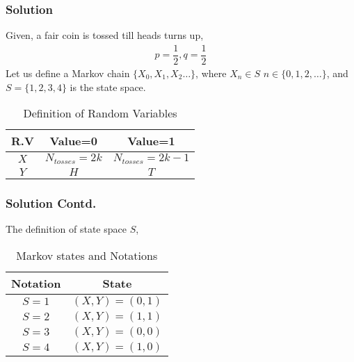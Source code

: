 \documentclass{beamer}
\begin{document}
\begin{frame}
\frametitle{Solution}
    Given, a fair coin is tossed till heads turns up,
\begin{align}
p=\dfrac{1}{2},q=\dfrac{1}{2}
\label{eq6}
\end{align}
    Let us define a Markov chain $\{X_{0},X_{1},X_{2}\dots\}$, where $X_{n}\in S$ \vee $n\in\{0,1,2,\dots\}$, and $S=\{1,2,3,4\}$ is the state space.
   \begin{table}[h!]
\centering
\caption{Definition of Random Variables}
\label{table:1}
\begin{tabular}{|c|c|c|}
    \hline
    R.V & Value=0 & Value=1 \\
    \hline
    $X$ & $N_{tosses}=2k$ & $N_{tosses}=2k-1$ \\[1ex]
    \hline
    $Y$ & $H$ & $T$ \\[1ex]
    \hline
\end{tabular}
\end{table}    
\end{frame}
\begin{frame}
 \frametitle{Solution Contd.}
 The definition of state space $S$,
      \begin{table}[h!]
\centering
\caption{Markov states and Notations }
\label{table:2}
\begin{tabular}{|c|c|}
    \hline
    Notation & State \\
    \hline
    $S=1$ & $(X,Y)=(0,1)$ \\[1ex]
    \hline
    $S=2$ & $(X,Y)=(1,1)$\\[1ex]
    \hline
    $S=3$ & $(X,Y)=(0,0)$\\[1ex]
    \hline
    $S=4$ & $(X,Y)=(1,0)$\\[1ex]
    \hline
\end{tabular}
\end{table}
\end{frame}
\end{document}
